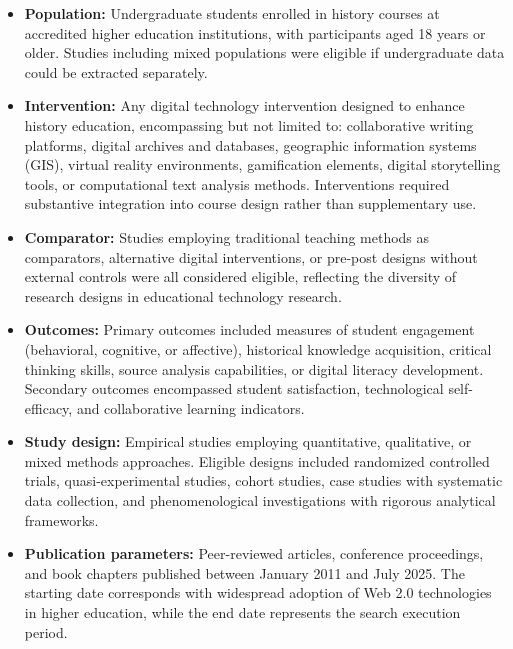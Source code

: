 \documentclass[
hf,
]{ceurart}
\begin{document}
\begin{itemize}[leftmargin=*,itemsep=3pt]
\item \textbf{Population:} Undergraduate students enrolled in history courses at accredited higher education institutions, with participants aged 18 years or older. Studies including mixed populations were eligible if undergraduate data could be extracted separately.

\item \textbf{Intervention:} Any digital technology intervention designed to enhance history education, encompassing but not limited to: collaborative writing platforms, digital archives and databases, geographic information systems (GIS), virtual reality environments, gamification elements, digital storytelling tools, or computational text analysis methods. Interventions required substantive integration into course design rather than supplementary use.

\item \textbf{Comparator:} Studies employing traditional teaching methods as comparators, alternative digital interventions, or pre-post designs without external controls were all considered eligible, reflecting the diversity of research designs in educational technology research.

\item \textbf{Outcomes:} Primary outcomes included measures of student engagement (behavioral, cognitive, or affective), historical knowledge acquisition, critical thinking skills, source analysis capabilities, or digital literacy development. Secondary outcomes encompassed student satisfaction, technological self-efficacy, and collaborative learning indicators.

\item \textbf{Study design:} Empirical studies employing quantitative, qualitative, or mixed methods approaches. Eligible designs included randomized controlled trials, quasi-experimental studies, cohort studies, case studies with systematic data collection, and phenomenological investigations with rigorous analytical frameworks.

\item \textbf{Publication parameters:} Peer-reviewed articles, conference proceedings, and book chapters published between January 2011 and July 2025. The starting date corresponds with widespread adoption of Web 2.0 technologies in higher education, while the end date represents the search execution period.
\end{itemize}
\end{document}
